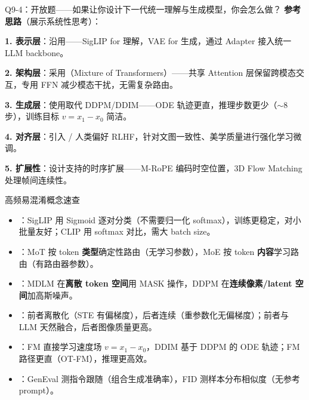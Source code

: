 \begin{conceptbox}{Q9-4：开放题——如果让你设计下一代统一理解与生成模型，你会怎么做？}
\textbf{参考思路}（展示系统性思考）：

\textbf{1. 表示层}：沿用——SigLIP for 理解，VAE for 生成，通过 Adapter 接入统一 LLM backbone。

\textbf{2. 架构层}：采用（Mixture of Transformers）——共享 Attention 层保留跨模态交互，专用 FFN 减少模态干扰，无需复杂路由。

\textbf{3. 生成层}：使用取代 DDPM/DDIM——ODE 轨迹更直，推理步数更少（$\sim 8$ 步），训练目标 $v = x_1 - x_0$ 简洁。

\textbf{4. 对齐层}：引入 / 人类偏好 RLHF，针对文图一致性、美学质量进行强化学习微调。

\textbf{5. 扩展性}：设计支持的时序扩展——M-RoPE 编码时空位置，3D Flow Matching 处理帧间连续性。

\end{conceptbox}

\begin{warnbox}{高频易混淆概念速查}
\begin{itemize}
  \item {}：SigLIP 用 Sigmoid 逐对分类（不需要归一化 softmax），训练更稳定，对小批量友好；CLIP 用 softmax 对比，需大 batch size。
  \item {}：MoT 按 token \textbf{类型}确定性路由（无学习参数），MoE 按 token \textbf{内容}学习路由（有路由器参数）。
  \item {}：MDLM 在\textbf{离散 token 空间}用 MASK 操作，DDPM 在\textbf{连续像素/latent 空间}加高斯噪声。
  \item {}：前者离散化（STE 有偏梯度），后者连续（重参数化无偏梯度）；前者与 LLM 天然融合，后者图像质量更高。
  \item {}：FM 直接学习速度场 $v = x_1 - x_0$，DDIM 基于 DDPM 的 ODE 轨迹；FM 路径更直（OT-FM），推理更高效。
  \item {}：GenEval 测指令跟随（组合生成准确率），FID 测样本分布相似度（无参考 prompt）。
\end{itemize}
\end{warnbox}

